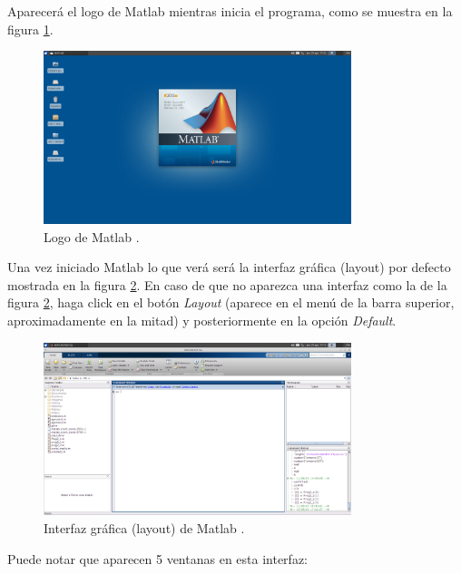 \documentclass[letter,11pt]{article}
\newcommand\0{\mathbf{0}}
\newcommand{\matlab}{{\sc Matlab }}
\begin{document}
\newpage

Aparecer\'a el logo de \matlab{} mientras inicia el programa, como se muestra en la figura \ref{fig:logo_matlab}. 

\begin{figure}[h]
\centering
\includegraphics[width=0.8\textwidth]{inicio_matlab.png}
\caption{Logo de \matlab.}\label{fig:logo_matlab}
\end{figure}

Una vez iniciado \matlab{} lo que ver\'a ser\'a la interfaz gr\'afica (layout) por defecto mostrada en la figura \ref{fig:layout_matlab}. En caso de que no aparezca una interfaz como la de la figura \ref{fig:layout_matlab}, haga click en el bot\'on \emph{Layout} (aparece en el men\'u de la barra superior, aproximadamente en la mitad) y posteriormente en la opci\'on \emph{Default}.

\begin{figure}[h]
\centering
\includegraphics[width=0.8\textwidth]{layout_matlab.png}
\caption{Interfaz gr\'afica (layout) de \matlab.}\label{fig:layout_matlab}
\end{figure}

Puede notar que aparecen 5 ventanas en esta interfaz:
\end{document}
